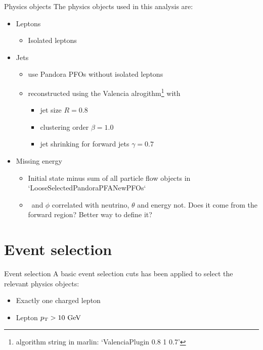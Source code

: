 \documentclass{beamer}
\begin{document}
\begin{frame}{Physics objects}
The physics objects used in this analysis are:
\begin{itemize}
  \item Leptons
  \begin{itemize}
    \item Isolated leptons
  \end{itemize}
  \item Jets
  \begin{itemize}
    \item use Pandora PFOs without isolated leptons
    \item reconstructed using the Valencia alrogithm\footnote{algorithm string in marlin: `ValenciaPlugin 0.8 1 0.7'} with
    \begin{itemize}
      \item jet size $R=0.8$
      \item clustering order $\beta=1.0$
      \item jet shrinking for forward jets $\gamma=0.7$
    \end{itemize}
  \end{itemize}
  \item Missing energy
  \begin{itemize}
    \item Initial state minus sum of all particle flow objects in `LooseSelectedPandoraPFANewPFOs`
    \item \pt\ and $\phi$ correlated with neutrino, $\theta$ and energy not. Does it come from the forward region? Better way to define it?
  \end{itemize}
\end{itemize}
\end{frame}










\section{Event selection}

\begin{frame}{Event selection}
A basic event selection cuts has been applied to select the relevant physics objects:
\begin{itemize}
\item Exactly one charged lepton
\item Lepton $p_\mathrm{T} > 10~\mathrm{GeV}$
\end{itemize}
\end{frame}
\end{document}

